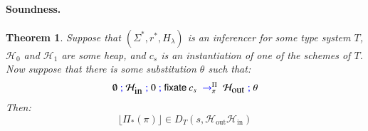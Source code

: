 \documentclass[preprint,natbib]{sigplanconf}
\newcommand\Rule{r}
\newcommand\Rules{\Rule^*}
\newcommand\Statement{c}
\newcommand\Scheme{\Sigma}
\newcommand\Schemes{\Scheme^*}
\newcommand\SchemeName{s}
\newcommand\In{\mbox{in}}
\newcommand\Out{\mbox{out}}
\newcommand\Haskell{H_{\!\lambda}}
\newcommand\Fixate{\mathsf{fixate}}
\newcommand\Heap{\mathcal{H}}
\newcommand\Substitution{\theta}
\newcommand\Deriv{\pi}
\newcommand\DerivsEnv{\Pi}
\newcommand\attrsep{\;\textcolor{blue}{;}\;}
\newcommand\transition[2]{\;\;\textcolor{blue}{\rightarrow}^{#1}_{#2}\;\;}
\newcommand\erasure[1]{\lfloor #1 \rfloor}
\newtheorem{thm}{Theorem}[section]
\begin{document}
  \paragraph{Soundness.}
  
  \begin{thm}
  Suppose that $(\Schemes,\Rules,\Haskell)$ is an inferencer for some type system $T$,
  $\Heap_0$ and $\Heap_1$ are some heap, and $\Statement_{\SchemeName}$ is an instantiation of
  one of the schemes of $T$.
  Now suppose that there is some substitution $\Substitution$ such that:
  \begin{displaymath}
    \emptyset \attrsep \Heap_{\In} \attrsep 0 \attrsep \Fixate \: \Statement_{\SchemeName} \transition{\DerivsEnv}{\Deriv} \Heap_{\Out} \attrsep \Substitution
  \end{displaymath}
  Then:
  \begin{displaymath}
    \erasure{\DerivsEnv_{*}(\Deriv)} \in D_T(\SchemeName, \Heap_{\Out} \Heap_{\In})
  \end{displaymath}
  \end{thm}
  
\end{document}
